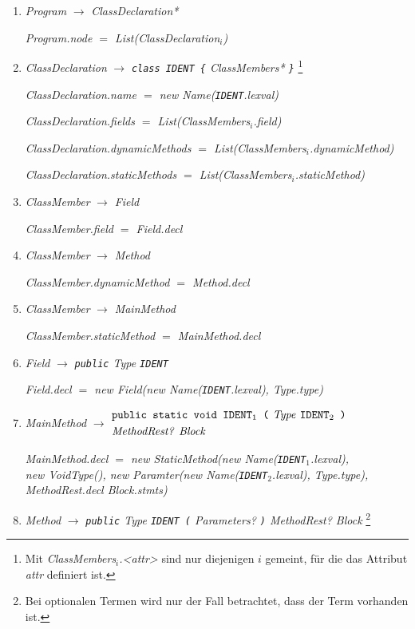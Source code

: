\documentclass[12pt,a4paper]{scrartcl}
\renewcommand{\prod}[2]{\textit{#1} $\rightarrow$ \textit{#2}}
\newcommand{\tok}[1]{\textnormal{\texttt{#1}}}
\newcommand{\assign}[2]{\textit{#1} $=$ #2}
\newcommand{\List}[1]{\textnormal{List(\textit{#1})}}
\newcommand{\new}[2]{\textnormal{new #1(\textit{#2})}}
\newcommand{\attr}[1]{\parbox{\linewidth}{\raggedleft \textit{#1}}}
\begin{document}
\begin{enumerate}
    \item \prod{Program}{ClassDeclaration*}\\
        \attr{\assign{Program.node}{\List{ClassDeclaration$_i$}}}
    \item \prod{ClassDeclaration}{\tok{class IDENT \{} ClassMembers* \tok{\}}}
        \footnote{Mit \textit{ClassMembers$_i$.<attr>} sind nur diejenigen $i$ gemeint, für die das Attribut \textit{attr} definiert ist.}\\
        \attr{\assign{ClassDeclaration.name}{\new{Name}{\tok{IDENT}.lexval}}}
        \attr{\assign{ClassDeclaration.fields}{\List{ClassMembers$_i$.field}}}
        \attr{\assign{ClassDeclaration.dynamicMethods}{\List{ClassMembers$_i$.dynamicMethod}}}
        \attr{\assign{ClassDeclaration.staticMethods}{\List{ClassMembers$_i$.staticMethod}}}
    \item \prod{ClassMember}{Field}\\
        \attr{\assign{ClassMember.field}{Field.decl}}
    \item \prod{ClassMember}{Method}\\
        \attr{\assign{ClassMember.dynamicMethod}{Method.decl}}
    \item \prod{ClassMember}{MainMethod}\\
        \attr{\assign{ClassMember.staticMethod}{MainMethod.decl}}
    \item \prod{Field}{\tok{public} Type \tok{IDENT}}\\
        \attr{\assign{Field.decl}{\new{Field}{\new{Name}{\tok{IDENT}.lexval}, Type.type}}}
    \item \textit{MainMethod} $\rightarrow$
        $\begin{aligned} &\textit{\tok{public static void IDENT$_1$ (} Type \tok{IDENT$_2$ )}} \\
                         &\textit{MethodRest? Block} \end{aligned}$\\
        \attr{\assign{MainMethod.decl}{\new{StaticMethod}{\new{Name}{\tok{IDENT$_1$}.lexval}, \\\new{VoidType}{}, \new{Paramter}{\new{Name}{\tok{IDENT}$_2$.lexval}, Type.type}, MethodRest.decl Block.stmts}}}
    \item \prod{Method}{\tok{public} Type \tok{IDENT (} Parameters? \tok{)} MethodRest? Block}
        \footnote{Bei optionalen Termen wird nur der Fall betrachtet, dass der Term vorhanden ist.}\\

\end{enumerate}
\end{document}
